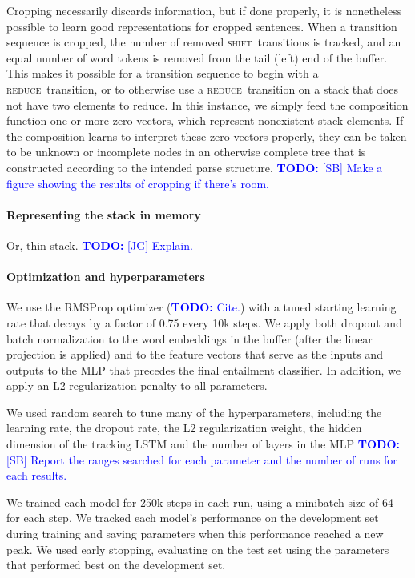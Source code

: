 \documentclass[11pt,letterpaper]{article}
\newcommand\todo[1]{\textcolor{blue}{\textbf{TODO:} #1}}
\newcommand{\shift}{\textsc{shift}}
\newcommand{\reduce}{\textsc{reduce}}
\begin{document}
Cropping necessarily discards information, but if done properly, it is nonetheless possible to learn good representations for cropped sentences. When a transition sequence is cropped, the number of removed \shift~transitions is tracked, and an equal number of word tokens is removed from the tail (left) end of the buffer. This makes it possible for a transition sequence to begin with a \reduce~transition, or to otherwise use a \reduce~transition on a stack that does not have two elements to reduce. In this instance, we simply feed the composition function one or more zero vectors, which represent nonexistent stack elements. If the composition learns to interpret these zero vectors properly, they can be taken to be unknown or incomplete nodes in an otherwise complete tree that is constructed according to the intended parse structure. \todo{[SB] Make a figure showing the results of cropping if there's room.}

\paragraph{Representing the stack in memory} Or, thin stack. 
\todo{[JG] Explain.}

\vspace{8em}

\paragraph{Optimization and hyperparameters}

We use the RMSProp optimizer (\todo{Cite.}) with a tuned starting learning rate that decays by a factor of 0.75 every 10k steps. We apply both dropout \cite{srivastava2014dropout} and batch normalization \cite{2015SIoffeCSzegedy} to the word embeddings in the buffer (after the linear projection is applied) and to the feature vectors that serve as the inputs and outputs to the MLP that precedes the final entailment classifier. In addition, we apply an L2 regularization penalty to all parameters.

We used random search to tune many of the hyperparameters, including the learning rate, the dropout rate, the L2 regularization weight, the hidden dimension of the tracking LSTM and the number of layers in the MLP \todo{[SB] Report the ranges searched for each parameter and the number of runs for each results.}

We trained each model for 250k steps in each run, using a minibatch size of 64 for each step. We tracked each model's performance on the development set during training and saving parameters when this performance reached a new peak. We used early stopping, evaluating on the test set using the parameters that performed best on the development set.
\end{document}
